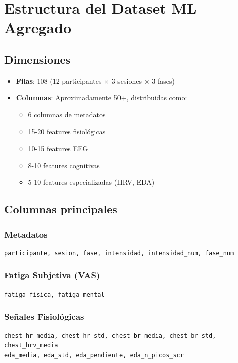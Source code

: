 \documentclass[12pt,a4paper]{article}
\begin{document}
\section{Estructura del Dataset ML Agregado}

\subsection{Dimensiones}

\begin{itemize}
    \item \textbf{Filas}: 108 (12 participantes $\times$ 3 sesiones $\times$ 3 fases)
    \item \textbf{Columnas}: Aproximadamente 50+, distribuidas como:
        \begin{itemize}
            \item 6 columnas de metadatos
            \item 15-20 features fisiológicas
            \item 10-15 features EEG
            \item 8-10 features cognitivas
            \item 5-10 features especializadas (HRV, EDA)
        \end{itemize}
\end{itemize}

\subsection{Columnas principales}

\subsubsection{Metadatos}
\begin{lstlisting}
participante, sesion, fase, intensidad, intensidad_num, fase_num
\end{lstlisting}

\subsubsection{Fatiga Subjetiva (VAS)}
\begin{lstlisting}
fatiga_fisica, fatiga_mental
\end{lstlisting}

\subsubsection{Señales Fisiológicas}
\begin{lstlisting}
chest_hr_media, chest_hr_std, chest_br_media, chest_br_std, chest_hrv_media
eda_media, eda_std, eda_pendiente, eda_n_picos_scr
\end{lstlisting}
\end{document}

